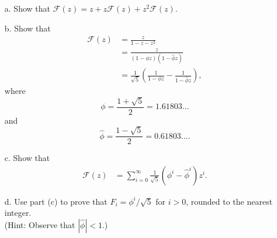 \begin{enumerate}
{\begin{enumerate}
  \item[a.] Show that $\mathcal{F}(z) = z + z \mathcal{F}(z) + z^2 \mathcal{F}(z)$.
  \item[b.] Show that
    \begin{equation*}
    \begin{aligned}
      \mathcal{F}(z) &= \frac{z}{1 - z - z^2}\\
                     &= \frac{z}{(1 - \phi z)(1 - \hat\phi z)}\\
                     &= \frac{1}{\sqrt 5} \left( \frac{1}{1 - \phi z} - \frac{1}{1 - \hat\phi z} \right),
    \end{aligned}
    \end{equation*}
    where
    \[
      \phi = \frac{1 + \sqrt 5}{2} = 1.61803 \dots
    \]
    and
    \[
      \hat\phi = \frac{1 - \sqrt 5}{2} = 0.61803 \dots .
    \]
  \item[c.] Show that
    \begin{equation*}
    \begin{aligned}
      \mathcal{F}(z) &= \sum_{i = 0}^\infty \frac{1}{\sqrt 5} (\phi^i - \hat\phi^i) z^i.
    \end{aligned}
    \end{equation*}
  \item[d.] Use part (c) to prove that $F_i = \phi^i/\sqrt{5}$ for $i > 0$,
    rounded to the nearest integer.\\(Hint: Observe that $|\hat\phi| < 1$.)
\end{enumerate}
}


\end{enumerate}
